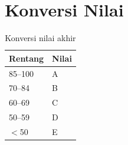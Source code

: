 \section{Konversi Nilai}
\label{app:rubrik-nilai}

\begin{table}[H]
\centering
\caption{Konversi nilai akhir}
\label{tab:app-nilai}
\begin{tabular}{@{}ll@{}}
\toprule
\textbf{Rentang} & \textbf{Nilai} \\
\midrule
85--100 & A \\
70--84 & B \\
60--69 & C \\
50--59 & D \\
$<$50 & E \\
\bottomrule
\end{tabular}
\end{table}
